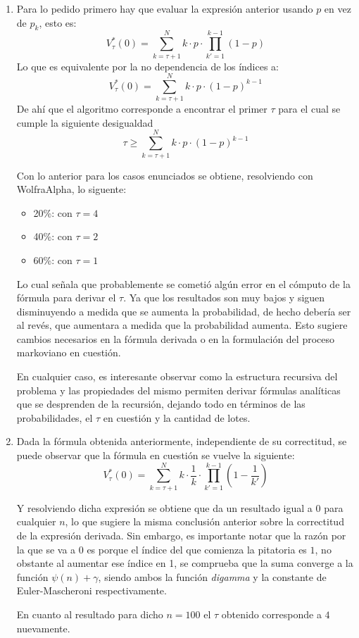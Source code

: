 \documentclass[letterpaper,10pt]{article}
\begin{document}
\begin{enumerate}
    \item Para lo pedido primero hay que evaluar la expresión anterior usando $p$ en vez de $p_k$, esto es:
    $$V^*_\tau(0) = \sum_{k=\tau+1}^{N}k\cdot p \cdot \prod_{k'=1}^{k-1}(1-p)$$
    Lo que es equivalente por la no dependencia de los índices a:
    $$V^*_\tau(0) = \sum_{k=\tau+1}^{N}k\cdot p \cdot (1-p)^{k-1}$$
    De ahí que el algoritmo corresponde a encontrar el primer $\tau$ para el cual se cumple la siguiente desigualdad
    $$\tau \geq \sum_{k=\tau+1}^{N}k\cdot p \cdot (1-p)^{k-1}$$
    
    Con lo anterior para los casos enunciados se obtiene, resolviendo con WolfraAlpha, lo siguente:
    \begin{itemize}
        \item 20\%: con $\tau=4$ 
        \item 40\%: con $\tau=2$ 
        \item 60\%: con $\tau=1$ 
    \end{itemize}
    
    Lo cual señala que probablemente se cometió algún error en el cómputo de la fórmula para derivar el $\tau$. Ya que los resultados son muy bajos y siguen disminuyendo a medida que se aumenta la probabilidad, de hecho debería ser al revés, que aumentara a medida que la probabilidad aumenta. Esto sugiere cambios necesarios en la fórmula derivada o en la formulación del proceso markoviano en cuestión.

    En cualquier caso, es interesante observar como la estructura recursiva del problema y las propiedades del mismo permiten derivar fórmulas analíticas que se desprenden de la recursión, dejando todo en términos de las probabilidades, el $\tau$ en cuestión y la cantidad de lotes.
    
    \item Dada la fórmula obtenida anteriormente, independiente de su correctitud, se puede observar que la fórmula en cuestión se vuelve la siguiente:
    $$V^*_\tau(0) = \sum_{k=\tau+1}^{N}k\cdot \frac{1}{k} \cdot \prod_{k'=1}^{k-1}(1-\frac{1}{k'})$$
    
    Y resolviendo dicha expresión se obtiene que da un resultado igual a $0$ para cualquier $n$, lo que sugiere la misma conclusión anterior sobre la correctitud de la expresión derivada. Sin embargo, es importante notar que la razón por la que se va a 0 es porque el índice del que comienza la pitatoria es $1$, no obstante al aumentar ese índice en 1, se comprueba que la suma converge a la función $\psi(n) + \gamma$, siendo ambos la función \textit{digamma} y la constante de Euler-Mascheroni respectivamente.
    
    En cuanto al resultado para dicho $n=100$ el $\tau$ obtenido corresponde a $4$ nuevamente.
    
\end{enumerate}
\end{document}
